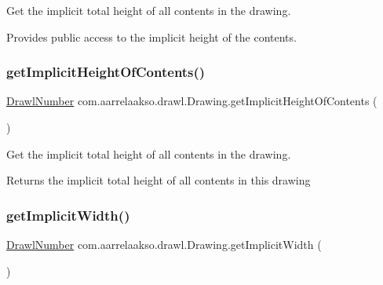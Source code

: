 Get the implicit total height of all contents in the drawing. 

Provides public access to the implicit height of the contents. \mbox{\label{classcom_1_1aarrelaakso_1_1drawl_1_1_drawing_a9c53863b57c91b1b6ccc63cba9e0c73c}} 
\subsubsection{\texorpdfstring{get\+Implicit\+Height\+Of\+Contents()}{getImplicitHeightOfContents()}}
{\footnotesize\ttfamily \hyperlink{classcom_1_1aarrelaakso_1_1drawl_1_1_drawl_number}{Drawl\+Number} com.\+aarrelaakso.\+drawl.\+Drawing.\+get\+Implicit\+Height\+Of\+Contents (\begin{DoxyParamCaption}{ }\end{DoxyParamCaption})\hspace{0.3cm}{\ttfamily [private]}}



Get the implicit total height of all contents in the drawing. 

\begin{DoxyReturn}{Returns}
the implicit total height of all contents in this drawing 
\end{DoxyReturn}
\mbox{\label{classcom_1_1aarrelaakso_1_1drawl_1_1_drawing_a833e9f69bd01b9640e34286ab53c0c90}} 
\subsubsection{\texorpdfstring{get\+Implicit\+Width()}{getImplicitWidth()}}
{\footnotesize\ttfamily \hyperlink{classcom_1_1aarrelaakso_1_1drawl_1_1_drawl_number}{Drawl\+Number} com.\+aarrelaakso.\+drawl.\+Drawing.\+get\+Implicit\+Width (\begin{DoxyParamCaption}{ }\end{DoxyParamCaption})}



